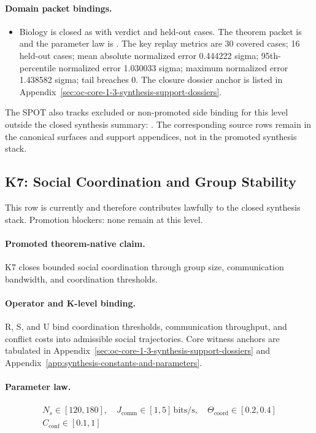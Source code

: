 \paragraph{Domain packet bindings.}
\begin{itemize}[leftmargin=1.6em,nosep]
\item Biology is closed as  with verdict  and  held-out cases. The theorem packet is  and the parameter law is . The key replay metrics are 30 covered cases; 16 held-out cases; mean absolute normalized error 0.444222 sigma; 95th-percentile normalized error 1.030033 sigma; maximum normalized error 1.438582 sigma; tail breaches 0. The closure dossier anchor is listed in Appendix~\ref{sec:oc-core-1-3-synthesis-support-dossiers}.
\end{itemize}
The SPOT also tracks  excluded or non-promoted side binding for this level outside the closed synthesis summary: . The corresponding source rows remain in the canonical surfaces and support appendices, not in the promoted synthesis stack.

\subsection{K7: Social Coordination and Group Stability}
\label{sec:oc-core-1-3-synthesis-k7}
This row is currently  and therefore contributes lawfully to the closed synthesis stack.
Promotion blockers: none remain at this level.

\paragraph{Promoted theorem-native claim.}
K7 closes bounded social coordination through group size, communication bandwidth, and coordination thresholds.

\paragraph{Operator and K-level binding.}
R, S, and U bind coordination thresholds, communication throughput, and conflict costs into admissible social trajectories.
Core witness anchors are tabulated in Appendix~\ref{sec:oc-core-1-3-synthesis-support-dossiers} and Appendix~\ref{app:synthesis-constants-and-parameters}.

\paragraph{Parameter law.}
\[
\begin{gathered} N_s \in [120,180],\quad J_{\mathrm{comm}} \in [1,5]\,\mathrm{bits/s},\quad \Theta_{\mathrm{coord}} \in [0.2,0.4] \\ C_{\mathrm{conf}} \in [0.1,1] \end{gathered}
\]

